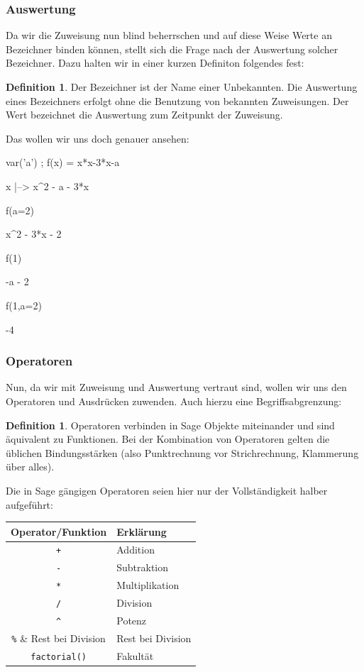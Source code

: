 \documentclass[fontsize=12pt,paper=a4,twoside,bibtotoc,idxtotoc,
liststotoc,pagesize,BCOR1.2cm,DIV15,chapterprefix,pagesize=pdftex]{scrbook}
\theoremstyle{plain}
\theoremstyle{definition}
\newtheorem{df}[equation]{Definition}
\theoremstyle{remark}
\begin{document}
\subsubsection{Auswertung}
Da wir die Zuweisung nun blind beherrschen und auf diese Weise Werte an Bezeichner binden können, stellt sich die Frage nach der Auswertung solcher 
Bezeichner. Dazu halten wir in einer kurzen Definiton folgendes fest:
\begin{df}
 Der Bezeichner ist der Name einer Unbekannten. Die Auswertung eines Bezeichners erfolgt ohne die Benutzung von bekannten Zuweisungen. Der Wert 
bezeichnet die Auswertung zum Zeitpunkt der Zuweisung.
\end{df}
Das wollen wir uns doch genauer ansehen:
    \begin{sagein}
    var('a') ; f(x) = x*x-3*x-a
    \end{sagein}
    \begin{sageout}
    x |--> x^2 - a - 3*x
    \end{sageout}
    \begin{sagein}
    f(a=2)
    \end{sagein}
    \begin{sageout}
    x^2 - 3*x - 2 
    \end{sageout}
    \begin{sagein}
    f(1)
    \end{sagein}
    \begin{sageout}
      -a - 2
    \end{sageout}
    \begin{sagein}
    f(1,a=2)
    \end{sagein}
    \begin{sageout}
      -4
    \end{sageout}
\subsubsection{Operatoren}
Nun, da wir mit Zuweisung und Auswertung vertraut sind, wollen wir uns den Operatoren und Ausdrücken zuwenden. Auch hierzu eine Begriffsabgrenzung:
\begin{df}
 Operatoren verbinden in Sage Objekte miteinander und sind äquivalent zu Funktionen. Bei der Kombination von Operatoren gelten die üblichen 
Bindungsstärken (also Punktrechnung vor Strichrechnung, Klammerung über alles).
\end{df}
Die in Sage gängigen Operatoren seien hier nur der Vollständigkeit halber aufgeführt:
\begin{center}
\begin{tabular}{|c|l|}
\hline
Operator/Funktion &  Erklärung\\
\hline
\hline
\verb!+! & Addition \\
\verb!-! & Subtraktion\\
\verb!*! & Multiplikation \\
\verb!/! & Division\\
\verb!^! & Potenz\\
\verb!%! &  Rest bei Division\\
\verb!factorial()! & Fakultät \\
\hline
\end{tabular}
\end{center}
\end{document}
